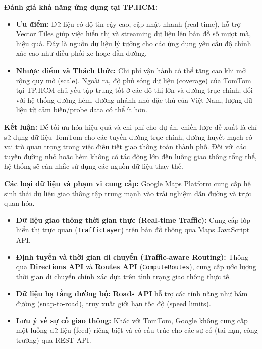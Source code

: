 \textbf{Đánh giá khả năng ứng dụng tại TP.HCM:}
\begin{itemize}
    \item \textbf{Ưu điểm:} Dữ liệu có độ tin cậy cao, cập nhật nhanh (real-time), hỗ trợ Vector Tiles giúp việc hiển thị và streaming dữ liệu lên bản đồ số mượt mà, hiệu quả. Đây là nguồn dữ liệu lý tưởng cho các ứng dụng yêu cầu độ chính xác cao như điều phối xe hoặc dẫn đường.
    \item \textbf{Nhược điểm và Thách thức:} Chi phí vận hành có thể tăng cao khi mở rộng quy mô (scale). Ngoài ra, độ phủ sóng dữ liệu (coverage) của TomTom tại TP.HCM chủ yếu tập trung tốt ở các đô thị lớn và đường trục chính; đối với hệ thống đường hẻm, đường nhánh nhỏ đặc thù của Việt Nam, lượng dữ liệu từ cảm biến/probe data có thể ít hơn.
\end{itemize}

\textbf{Kết luận:} Để tối ưu hóa hiệu quả và chi phí cho dự án, chiến lược đề xuất là chỉ sử dụng dữ liệu TomTom cho các tuyến đường trục chính, đường huyết mạch có vai trò quan trọng trong việc điều tiết giao thông toàn thành phố. Đối với các tuyến đường nhỏ hoặc hẻm không có tác động lớn đến luồng giao thông tổng thể, hệ thống sẽ cân nhắc sử dụng các nguồn dữ liệu thay thế.


\textbf{Các loại dữ liệu và phạm vi cung cấp:} Google Maps Platform cung cấp hệ sinh thái dữ liệu giao thông tập trung mạnh vào trải nghiệm dẫn đường và trực quan hóa.
\begin{itemize}
    \item \textbf{Dữ liệu giao thông thời gian thực (Real-time Traffic):} Cung cấp lớp hiển thị trực quan (\texttt{TrafficLayer}) trên bản đồ thông qua Maps JavaScript API.
    \item \textbf{Định tuyến và thời gian di chuyển (Traffic-aware Routing):} Thông qua \textbf{Directions API} và \textbf{Routes API} (\texttt{ComputeRoutes}), cung cấp ước lượng thời gian di chuyển chính xác dựa trên tình trạng giao thông thực tế.
    \item \textbf{Dữ liệu hạ tầng đường bộ:} \textbf{Roads API} hỗ trợ các tính năng như bám đường (snap-to-road), truy xuất giới hạn tốc độ (speed limits).
    \item \textbf{Lưu ý về sự cố giao thông:} Khác với TomTom, Google không cung cấp một luồng dữ liệu (feed) riêng biệt và có cấu trúc cho các sự cố (tai nạn, công trường) qua REST API.
\end{itemize}

